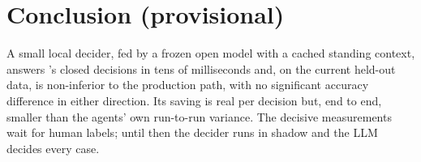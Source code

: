 \section{Conclusion (provisional)}
A small local decider, fed by a frozen open model with a cached standing context, answers \sys{}'s closed decisions in tens of milliseconds and, on the current held-out data, is non-inferior to the production path, with no significant accuracy difference in either direction. Its saving is real per decision but, end to end, smaller than the agents' own run-to-run variance. The decisive measurements wait for human labels; until then the decider runs in shadow and the LLM decides every case. \prov{}
